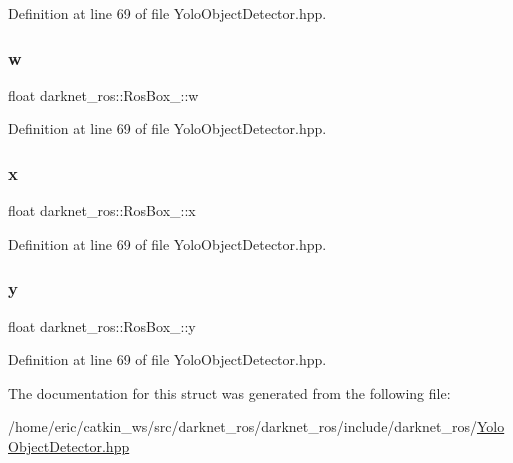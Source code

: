 Definition at line 69 of file Yolo\+Object\+Detector.\+hpp.

\mbox{\label{structdarknet__ros_1_1RosBox___aaa6ba65715e618e2e35f2a880be791dc}} 
\subsubsection{\texorpdfstring{w}{w}}
{\footnotesize\ttfamily float darknet\+\_\+ros\+::\+Ros\+Box\+\_\+\+::w}



Definition at line 69 of file Yolo\+Object\+Detector.\+hpp.

\mbox{\label{structdarknet__ros_1_1RosBox___a779bfc5f14e363b8eb59cc10de081e81}} 
\subsubsection{\texorpdfstring{x}{x}}
{\footnotesize\ttfamily float darknet\+\_\+ros\+::\+Ros\+Box\+\_\+\+::x}



Definition at line 69 of file Yolo\+Object\+Detector.\+hpp.

\mbox{\label{structdarknet__ros_1_1RosBox___a3a9fbd56994bf5fa7959806b392d1bd9}} 
\subsubsection{\texorpdfstring{y}{y}}
{\footnotesize\ttfamily float darknet\+\_\+ros\+::\+Ros\+Box\+\_\+\+::y}



Definition at line 69 of file Yolo\+Object\+Detector.\+hpp.



The documentation for this struct was generated from the following file\+:\begin{DoxyCompactItemize}
\item 
/home/eric/catkin\+\_\+ws/src/darknet\+\_\+ros/darknet\+\_\+ros/include/darknet\+\_\+ros/\mbox{\hyperlink{YoloObjectDetector_8hpp}{Yolo\+Object\+Detector.\+hpp}}\end{DoxyCompactItemize}
